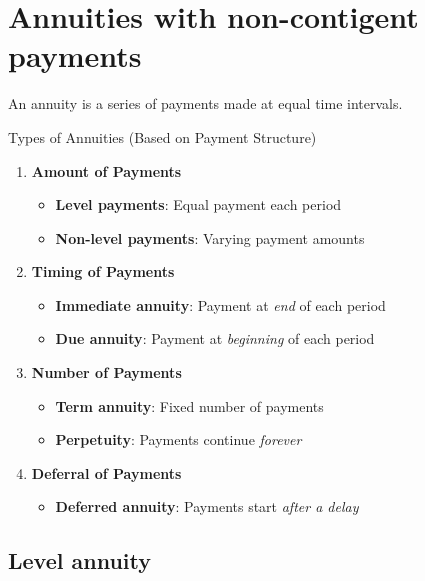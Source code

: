 \chapter{Annuities with non-contigent payments}
\label{chapter_annuity}


\begin{definition}
\label{definition:annuity}
An annuity is a series of payments made at equal time intervals. 
\end{definition}

    Types of Annuities (Based on Payment Structure)
\begin{comments}
\begin{enumerate}
  \item \textbf{Amount of Payments}
  \begin{itemize}
    \item \textbf{Level payments}: Equal payment each period
    \item \textbf{Non-level payments}: Varying payment amounts
  \end{itemize}
  
  \item \textbf{Timing of Payments}
  \begin{itemize}
    \item \textbf{Immediate annuity}: Payment at \textit{end} of each period
    \item \textbf{Due annuity}: Payment at \textit{beginning} of each period
  \end{itemize}
  
  \item \textbf{Number of Payments}
  \begin{itemize}
    \item \textbf{Term annuity}: Fixed number of payments
    \item \textbf{Perpetuity}: Payments continue \textit{forever}
  \end{itemize}
  
  \item \textbf{Deferral of Payments}
  \begin{itemize}
    \item \textbf{Deferred annuity}: Payments start \textit{after a delay}
  \end{itemize}
\end{enumerate}
\end{comments}


\section{Level annuity} 
